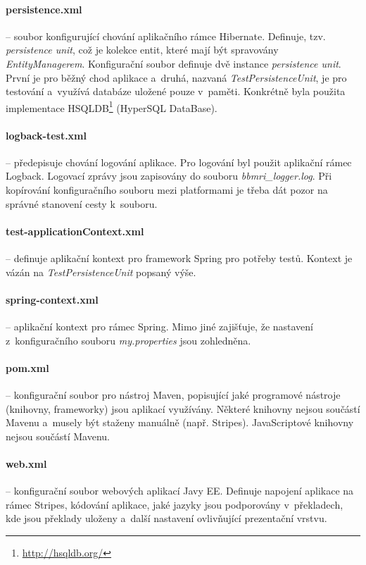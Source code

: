 \documentclass[11pt, final, oneside]{fithesis2}
\begin{document}
\paragraph*{persistence.xml} -- soubor konfigurující chování aplikačního rámce Hibernate. Definuje, tzv. \textit{persistence unit}, což je kolekce entit, které mají být spravovány \textit{EntityManagerem}.
Konfigurační soubor definuje dvě instance \textit{persistence unit}. První je pro běžný chod aplikace a~druhá, nazvaná \textit{TestPersistenceUnit}, je pro testování a~využívá databáze uložené pouze v~paměti.
Konkrétně byla použita implementace HSQLDB\footnote{\url{http://hsqldb.org/}} (HyperSQL DataBase).

\paragraph*{logback-test.xml} -- předepisuje chování logování aplikace. Pro logování byl použit aplikační rámec Logback. Logovací zprávy jsou zapisovány do souboru \textit{bbmri\_logger.log}. Při kopírování konfiguračního souboru mezi platformami je třeba dát pozor na správné stanovení cesty k~souboru.

\paragraph*{test-applicationContext.xml} -- definuje aplikační kontext pro framework Spring pro potřeby testů. Kontext je vázán na \textit{TestPersistenceUnit} popsaný výše.

\paragraph*{spring-context.xml} -- aplikační kontext pro rámec Spring. Mimo jiné zajišťuje, že nastavení z~konfiguračního souboru \textit{my.properties} jsou zohledněna.

\paragraph*{pom.xml} -- konfigurační soubor pro nástroj Maven, popisující jaké programové nástroje (knihovny, frameworky) jsou aplikací využívány. Některé knihovny nejsou součástí Mavenu a~musely být staženy manuálně (např. Stripes). JavaScriptové knihovny nejsou součástí Mavenu.

\paragraph*{web.xml} -- konfigurační soubor webových aplikací Javy EE. Definuje napojení aplikace na rámec Stripes, kódování aplikace, jaké jazyky jsou podporovány v~překladech, kde jsou překlady uloženy a~další nastavení ovlivňující prezentační vrstvu.
\end{document}
